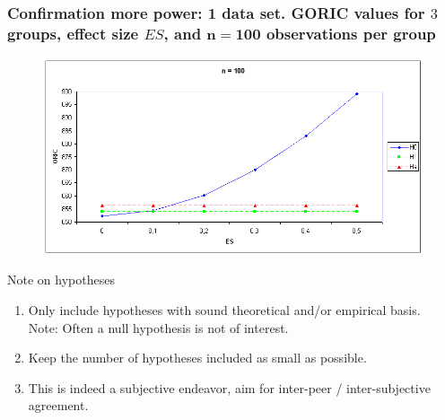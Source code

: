 \documentclass[10pt]{beamer}\usepackage[]{graphicx}\usepackage[]{xcolor}
\begin{document}
%
\begin{frame}
\frametitle{Confirmation more power: 1 data set. GORIC values for $3$ groups, effect size $ES$, and $\mathbf{n=100}$ observations per group}
\begin{figure}
    \centering
  \includegraphics[scale = 0.54]{ORICvsAIC_n100.png}\\
\end{figure}

\end{frame}
%
\begin{frame}{Note on hypotheses}
	\begin{enumerate}
		\item Only include hypotheses with sound theoretical and/or empirical basis.\\
		Note: Often a null hypothesis is not of interest.
		\item Keep the number of hypotheses included as small as possible.
		\item This is indeed a subjective endeavor, aim for inter-peer / inter-subjective agreement.
	\end{enumerate}
\end{frame}

%
\end{document}
